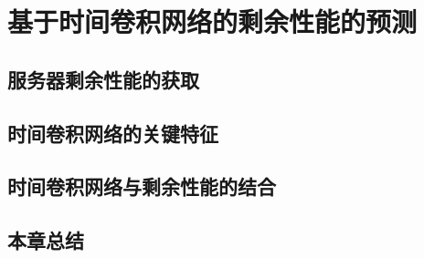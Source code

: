 \chapter{基于时间卷积网络的剩余性能的预测}

\section{服务器剩余性能的获取}

\section{时间卷积网络的关键特征}

\section{时间卷积网络与剩余性能的结合}

\section{本章总结}
